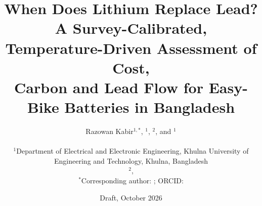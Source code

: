 \title{%
When Does Lithium Replace Lead?\\
A Survey-Calibrated, Temperature-Driven Assessment of Cost,\\
Carbon and Lead Flow for Easy-Bike Batteries in Bangladesh%
}

\author{%
    Razowan Kabir$^{1,*}$,
    $^{1}$,
    $^{2}$,
    and $^{1}$%
    \\[6pt]
    \parbox{0.92\textwidth}{\centering\small
        $^{1}$Department of Electrical and Electronic Engineering,
        Khulna University of Engineering and Technology,
        Khulna, Bangladesh\\[2pt]
        $^{2}$,
        \\[2pt]
        $^{*}$Corresponding author:
        ;
        ORCID: %
    }%
}
\date{Draft, October 2026}
